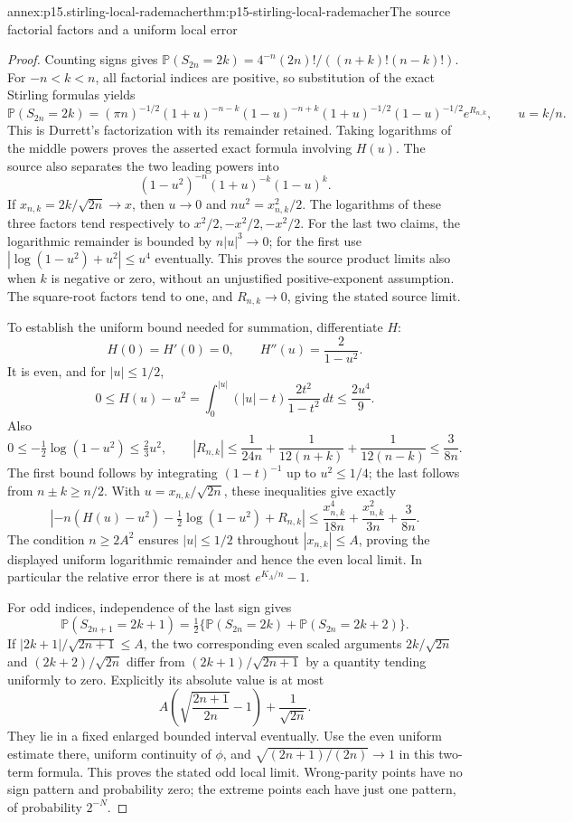 \begin{annexitem}{annex:p15.stirling-local-rademacher}{thm:p15-stirling-local-rademacher}{The source factorial factors and a uniform local error}
\begin{proof}
Counting signs gives
\(\mathbb P(S_{2n}=2k)=4^{-n}(2n)!/((n+k)!(n-k)!)\).
For \(-n<k<n\), all factorial indices are positive, so
substitution of the exact Stirling formulas yields
\[
 \mathbb P(S_{2n}=2k)
  =(\pi n)^{-1/2}
    (1+u)^{-n-k}(1-u)^{-n+k}
    (1+u)^{-1/2}(1-u)^{-1/2}e^{R_{n,k}},
 \qquad u=k/n.
\]
This is Durrett's factorization with its remainder retained.
Taking logarithms of the middle powers proves the asserted
exact formula involving \(H(u)\).
The source also separates the two leading powers into
\[
 (1-u^2)^{-n}(1+u)^{-k}(1-u)^k.
\]
If \(x_{n,k}=2k/\sqrt{2n}\to x\), then \(u\to0\) and
\(nu^2=x_{n,k}^2/2\). The logarithms of these three
factors tend respectively to \(x^2/2,-x^2/2,-x^2/2\).
For the last two claims, the logarithmic remainder is
bounded by \(n|u|^3\to0\); for the first use
\(|\log(1-u^2)+u^2|\leq u^4\) eventually.
This proves the source product limits also when \(k\)
is negative or zero, without an unjustified positive-exponent
assumption. The square-root factors tend to one, and
\(R_{n,k}\to0\), giving the stated source limit.

To establish the uniform bound needed for summation,
differentiate \(H\):
\[
 H(0)=H'(0)=0,\qquad H''(u)=\frac2{1-u^2}.
\]
It is even, and for \(|u|\leq1/2\),
\[
 0\leq H(u)-u^2
 =\int_0^{|u|}(|u|-t)\frac{2t^2}{1-t^2}\,dt
 \leq\frac{2u^4}{9}.
\]
Also
\[
 0\leq-\tfrac12\log(1-u^2)\leq\tfrac23u^2,\qquad
 |R_{n,k}|\leq\frac1{24n}
      +\frac1{12(n+k)}+\frac1{12(n-k)}
 \leq\frac3{8n}.
\]
The first bound follows by integrating \((1-t)^{-1}\)
up to \(u^2\leq1/4\); the last follows from
\(n\pm k\geq n/2\).
With \(u=x_{n,k}/\sqrt{2n}\), these inequalities give
exactly
\[
 \left|-n(H(u)-u^2)-\tfrac12\log(1-u^2)+R_{n,k}\right|
 \leq \frac{x_{n,k}^4}{18n}
        +\frac{x_{n,k}^2}{3n}+\frac3{8n}.
\]
The condition \(n\geq2A^2\) ensures \(|u|\leq1/2\)
throughout \(|x_{n,k}|\leq A\), proving the displayed
uniform logarithmic remainder and hence the even local
limit. In particular the relative error there is at most
\(e^{K_A/n}-1\).

For odd indices, independence of the last sign gives
\[
 \mathbb P(S_{2n+1}=2k+1)
     =\tfrac12\{\mathbb P(S_{2n}=2k)
                         +\mathbb P(S_{2n}=2k+2)\}.
\]
If \(|2k+1|/\sqrt{2n+1}\leq A\), the two corresponding
even scaled arguments \(2k/\sqrt{2n}\) and
\((2k+2)/\sqrt{2n}\) differ from
\((2k+1)/\sqrt{2n+1}\) by a quantity tending uniformly
to zero. Explicitly its absolute value is at most
\[
 A\left(\sqrt{\frac{2n+1}{2n}}-1\right)+\frac1{\sqrt{2n}}.
\]
They lie in a fixed enlarged bounded interval eventually.
Use the even uniform estimate there, uniform continuity
of \(\phi\), and \(\sqrt{(2n+1)/(2n)}\to1\) in this
two-term formula. This proves the stated odd local limit.
Wrong-parity points have no sign pattern and probability
zero; the extreme points each have just one pattern,
of probability \(2^{-N}\).
\end{proof}
\end{annexitem}


